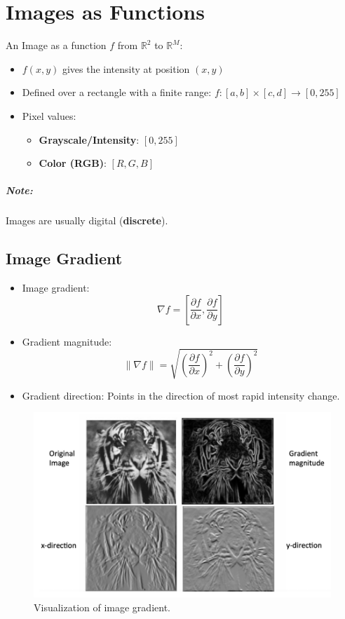 \chapter{Images as Functions}

An Image as a function $ f $ from $ \mathbb{R}^2 $ to $ \mathbb{R}^M $:
\begin{itemize}
    \item $ f(x,y) $ gives the intensity at position $ (x,y) $
    \item Defined over a rectangle with a finite range:
    $ f: [a,b] \times [c,d] \rightarrow [0,255] $
    \item Pixel values:
    \begin{itemize}
        \item \textbf{Grayscale/Intensity}: $[0,255]$
        \item \textbf{Color (RGB)}: $[R, G, B]$
    \end{itemize}
\end{itemize}

\paragraph{Note:} Images are usually digital (\textbf{discrete}).

\section{Image Gradient}
\begin{itemize}
    \item Image gradient:
    $$
    \nabla f = \left[\frac{\partial f}{\partial x}, \frac{\partial f}{\partial y}\right]
    $$
    \item Gradient magnitude:
    $$
    \|\nabla f\| = \sqrt{\left(\frac{\partial f}{\partial x}\right)^2 + \left(\frac{\partial f}{\partial y}\right)^2}
    $$
    \item Gradient direction: Points in the direction of most rapid intensity change.
\end{itemize}

\begin{figure}[htbp]
    \centering
    \includegraphics[scale=0.3]{figures/VisualizingImageGradient.png}
    \caption{Visualization of image gradient.}
\end{figure}

